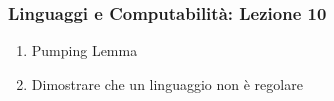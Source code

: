 




\begin{frame}[fragile]
	\frametitle{Linguaggi e Computabilità: Lezione 10}
\begin{enumerate}
\item
Pumping Lemma
\item
Dimostrare che un linguaggio non è regolare
\end{enumerate}
\end{frame}



